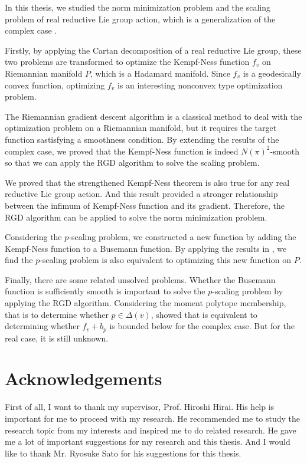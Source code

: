 \documentclass[suri,pdfbookmark]{engsuribt} %
\begin{document}
  In this thesis, we studied the norm minimization problem and the scaling problem of real reductive Lie group action, which is a generalization of the complex case \cite{key8}.

  Firstly, by applying the Cartan decomposition of a real reductive Lie group, these two problems are transformed to optimize the Kempf-Ness function $f_v$ on Riemannian manifold $P$, which is a Hadamard manifold. Since $f_v$ is a geodesically convex function, optimizing $f_v$ is an interesting nonconvex type optimization problem.

  The Riemannian gradient descent algorithm is a classical method to deal with the optimization problem on a Riemannian manifold, but it requires the target function sastisfying a smoothness condition. By extending the results of the complex case, we proved that the Kempf-Ness function is indeed $N(\pi)^2$-smooth so that we can apply the RGD algorithm to solve the scaling problem.

  We proved that the strengthened Kempf-Ness theorem is also true for any real reductive Lie group action. And this result provided a stronger relationship between the infimum of Kempf-Ness function and its gradient. Therefore, the RGD algorithm can be applied to solve the norm minimization problem.

  Considering the $p$-scaling problem, we constructed a new function by adding the Kempf-Ness function to a Busemann function. By applying the results in \cite{key12}, we find the $p$-scaling problem is also equivalent to optimizing this new function on $P$. 

  Finally, there are some related unsolved problems. Whether the Busemann function is sufficiently smooth is important to solve the $p$-scaling problem by applying the RGD algorithm. Considering the moment polytope membership, that is to determine whether $p \in \Delta(v)$, \cite{key12} showed that is equivalent to determining whether $f_v+b_p$ is bounded below for the complex case. But for the real case, it is still unknown.


\backmatter
\chapter{Acknowledgements}

  First of all, I want to thank my supervisor, Prof. Hiroshi Hirai. His help is important for me to proceed with my research. He recommended me to study the research topic from my interests and inspired me to do related research. He gave me a lot of important suggestions for my research and this thesis. And I would like to thank Mr. Ryosuke Sato for his suggestions for this thesis.
\end{document}
